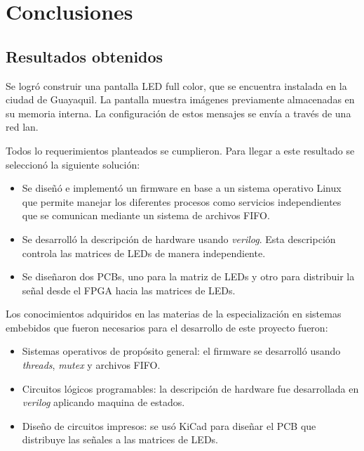 
\chapter{Conclusiones} %

\label{Chapter5} %



\section{Resultados obtenidos}




Se logró construir una pantalla LED full color, que se encuentra instalada en la ciudad de Guayaquil. La pantalla muestra imágenes previamente almacenadas en su memoria interna. La configuración de estos mensajes se envía a través de una red lan.

Todos lo requerimientos planteados se cumplieron. Para llegar a este resultado se seleccionó la siguiente solución:
\begin{itemize}
\item Se diseñó e implementó un firmware en base a un sistema operativo Linux que permite manejar los diferentes procesos como servicios independientes que se comunican mediante un sistema de archivos FIFO.
\item Se desarrolló la descripción de hardware usando \textit{verilog}.  Esta descripción controla las matrices de LEDs de manera independiente.
\item Se diseñaron dos PCBs, uno para la matriz de LEDs y otro para distribuir la señal desde el FPGA hacia las matrices de LEDs.
\end{itemize}
Los conocimientos adquiridos en las materias de la especialización en sistemas embebidos que fueron necesarios para el desarrollo de este proyecto fueron:
\begin{itemize}
\item Sistemas operativos de propósito general: el firmware se desarrolló usando \textit{threads}, \textit{mutex} y archivos FIFO.
\item Circuitos lógicos programables: la descripción de hardware fue desarrollada en \textit{verilog} aplicando maquina de estados.
\item Diseño de circuitos impresos: se usó KiCad para diseñar el PCB que distribuye las señales a las matrices de LEDs.
\end{itemize}


